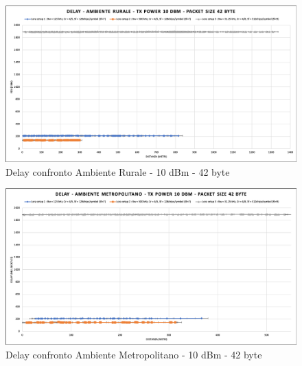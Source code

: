 \documentclass[12pt,a4paper,openright,twoside]{report}
\begin{document}
\begin{figure}[h]                      
\begin{center} 
\includegraphics[width=\textwidth]{DELAY_confronto_AR_10dBm_42byte.png}
\caption[Delay confronto Ambiente Rurale - 10 dBm - 42 byte]{Delay confronto Ambiente Rurale - 10 dBm - 42 byte}\label{fig:prima}
\end{center}
\end{figure}

\begin{figure}[h]                      
\begin{center} 
\includegraphics[width=\textwidth]{DELAY_confronto_AM_10dBm_42byte.png}
\caption[Delay confronto Ambiente Metropolitano - 10 dBm - 42 byte]{Delay confronto Ambiente Metropolitano - 10 dBm - 42 byte}\label{fig:prima}
\end{center}
\end{figure}
\end{document}
